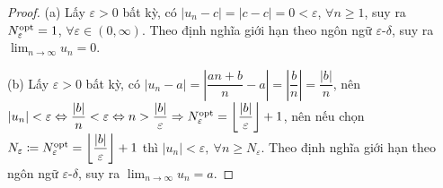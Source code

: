 \documentclass[oneside]{book}
\begin{document}
\begin{proof}
	(a) Lấy $\varepsilon > 0$ bất kỳ, có $|u_n - c| = |c - c| = 0 < \varepsilon$, $\forall n\ge1$, suy ra $N_\varepsilon^{\rm opt} = 1$, $\forall\varepsilon\in(0,\infty)$. Theo định nghĩa giới hạn theo ngôn ngữ $\varepsilon$-$\delta$, suy ra $\lim_{n\to\infty} u_n = 0$.
	
	\item(b) Lấy $\varepsilon > 0$ bất kỳ, có $|u_n - a| = \left|\dfrac{an + b}{n} - a\right| = \left|\dfrac{b}{n}\right| = \dfrac{|b|}{n}$, nên $|u_n| < \varepsilon\Leftrightarrow\dfrac{|b|}{n}< \varepsilon\Leftrightarrow n > \dfrac{|b|}{\varepsilon}\Rightarrow N_\varepsilon^{\rm opt} = \left\lfloor\dfrac{|b|}{\varepsilon}\right\rfloor + 1$, nên nếu chọn $N_\varepsilon\coloneqq N_\varepsilon^{\rm opt} = \left\lfloor\dfrac{|b|}{\varepsilon}\right\rfloor + 1$ thì $|u_n| < \varepsilon,\ \forall n\ge N_\varepsilon$. Theo định nghĩa giới hạn theo ngôn ngữ $\varepsilon$-$\delta$, suy ra $\lim_{n\to\infty} u_n = a$.
\end{proof}
\end{document}
